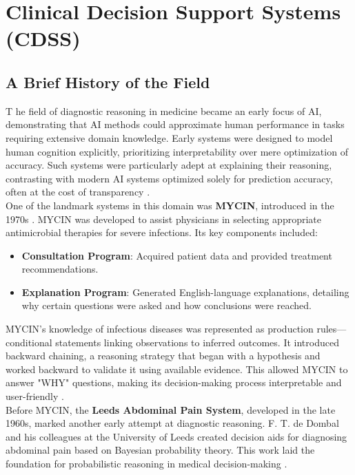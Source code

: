 \section{Clinical Decision Support Systems (CDSS)}
\label{sec:sota}
\subsection{A Brief History of the Field}
\lettrine{T}{ }he field of diagnostic reasoning in medicine became an early focus of AI, demonstrating that AI methods could approximate human performance in tasks requiring extensive domain knowledge. Early systems were designed to model human cognition explicitly, prioritizing interpretability over mere optimization of accuracy. Such systems were particularly adept at explaining their reasoning, contrasting with modern AI systems optimized solely for prediction accuracy, often at the cost of transparency \cite{cohen2022introducing}.\\[\baselineskip]

\noindent One of the landmark systems in this domain was \textcolor{TUMRed}{\textbf{MYCIN}}, introduced in the 1970s \cite{cohen2022intelligent, shortliffe2012computer, shortliffe1975model}. MYCIN was developed to assist physicians in selecting appropriate antimicrobial therapies for severe infections. Its key components included:
\begin{itemize}
    \item \textcolor{TUMRed}{\textbf{Consultation Program}}: Acquired patient data and provided treatment recommendations.
    \item \textcolor{TUMRed}{\textbf{Explanation Program}}: Generated English-language explanations, detailing why certain questions were asked and how conclusions were reached.
\end{itemize}

\noindent MYCIN's knowledge of infectious diseases was represented as production rules---conditional statements linking observations to inferred outcomes. It introduced backward chaining, a reasoning strategy that began with a hypothesis and worked backward to validate it using available evidence. This allowed MYCIN to answer "WHY" questions, making its decision-making process interpretable and user-friendly \cite{shortliffe1975model, musen2021clinical}.\\[\baselineskip]

\noindent Before MYCIN, the \textcolor{TUMRed}{\textbf{Leeds Abdominal Pain System}}, developed in the late 1960s, marked another early attempt at diagnostic reasoning. F. T. de Dombal and his colleagues at the University of Leeds created decision aids for diagnosing abdominal pain based on Bayesian probability theory. This work laid the foundation for probabilistic reasoning in medical decision-making \cite{musen2021clinical}.\\[\baselineskip]

